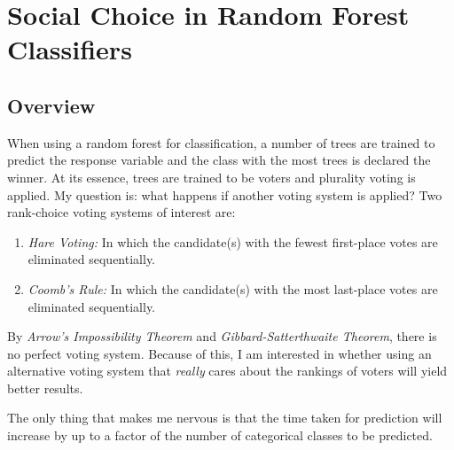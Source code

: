\section{Social Choice in Random Forest Classifiers}
\label{sec:choice-in-forests}

\subsection{Overview}
\label{sec:overview}

When using a random forest for classification, a number of trees are trained to predict the response variable and the class with the most trees is declared the winner. At its essence, trees are trained to be voters and plurality voting is applied. My question is: what happens if another voting system is applied? Two rank-choice voting systems of interest are:
\begin{enumerate}
\item \emph{Hare Voting:} In which the candidate(s) with the fewest first-place votes are eliminated sequentially.
\item \emph{Coomb's Rule:} In which the candidate(s) with the most last-place votes are eliminated sequentially.
\end{enumerate}
By \emph{Arrow's Impossibility Theorem} and \emph{Gibbard-Satterthwaite Theorem}, there is no perfect voting system. Because of this, I am interested in whether using an alternative voting system that \emph{really} cares about the rankings of voters will yield better results.

The only thing that makes me nervous is that the time taken for prediction will increase by up to a factor of the number of categorical classes to be predicted.



